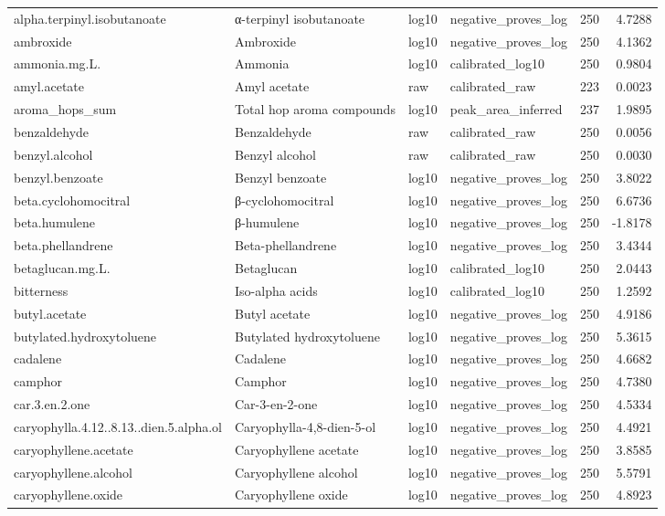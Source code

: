 {\begin{longtable}{llllrr}
alpha.terpinyl.isobutanoate & α-terpinyl isobutanoate & log10 & negative\_proves\_log & 250 & 4.7288 \\
ambroxide & Ambroxide & log10 & negative\_proves\_log & 250 & 4.1362 \\
ammonia.mg.L. & Ammonia & log10 & calibrated\_log10 & 250 & 0.9804 \\
amyl.acetate & Amyl acetate & raw & calibrated\_raw & 223 & 0.0023 \\
aroma\_hops\_sum & Total hop aroma compounds & log10 & peak\_area\_inferred & 237 & 1.9895 \\
benzaldehyde & Benzaldehyde & raw & calibrated\_raw & 250 & 0.0056 \\
benzyl.alcohol & Benzyl alcohol & raw & calibrated\_raw & 250 & 0.0030 \\
benzyl.benzoate & Benzyl benzoate & log10 & negative\_proves\_log & 250 & 3.8022 \\
beta.cyclohomocitral & β-cyclohomocitral & log10 & negative\_proves\_log & 250 & 6.6736 \\
beta.humulene & β-humulene & log10 & negative\_proves\_log & 250 & -1.8178 \\
beta.phellandrene & Beta-phellandrene & log10 & negative\_proves\_log & 250 & 3.4344 \\
betaglucan.mg.L. & Betaglucan & log10 & calibrated\_log10 & 250 & 2.0443 \\
bitterness & Iso-alpha acids & log10 & calibrated\_log10 & 250 & 1.2592 \\
butyl.acetate & Butyl acetate & log10 & negative\_proves\_log & 250 & 4.9186 \\
butylated.hydroxytoluene & Butylated hydroxytoluene & log10 & negative\_proves\_log & 250 & 5.3615 \\
cadalene & Cadalene & log10 & negative\_proves\_log & 250 & 4.6682 \\
camphor & Camphor & log10 & negative\_proves\_log & 250 & 4.7380 \\
car.3.en.2.one & Car-3-en-2-one & log10 & negative\_proves\_log & 250 & 4.5334 \\
caryophylla.4.12..8.13..dien.5.alpha.ol & Caryophylla-4,8-dien-5-ol & log10 & negative\_proves\_log & 250 & 4.4921 \\
caryophyllene.acetate & Caryophyllene acetate & log10 & negative\_proves\_log & 250 & 3.8585 \\
caryophyllene.alcohol & Caryophyllene alcohol & log10 & negative\_proves\_log & 250 & 5.5791 \\
caryophyllene.oxide & Caryophyllene oxide & log10 & negative\_proves\_log & 250 & 4.8923 \\

\end{longtable}}
